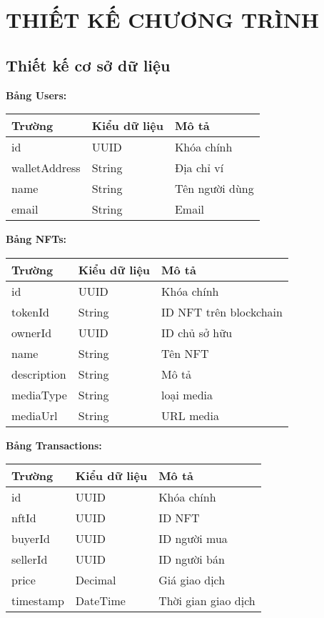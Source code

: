 \chapter{THIẾT KẾ CHƯƠNG TRÌNH}

\section{Thiết kế cơ sở dữ liệu}

\textbf{Bảng Users:}
\begin{center}
\begin{tabular}{|l|l|p{6cm}|}
    \hline
    \textbf{Trường} & \textbf{Kiểu dữ liệu} & \textbf{Mô tả} \\
    \hline
    id & UUID & Khóa chính \\
    \hline
    walletAddress & String & Địa chỉ ví \\
    \hline
    name & String & Tên người dùng \\
    \hline
    email & String & Email \\
    \hline
\end{tabular}
\end{center}

\textbf{Bảng NFTs:}
\begin{center}
\begin{tabular}{|l|l|p{6cm}|}
    \hline
    \textbf{Trường} & \textbf{Kiểu dữ liệu} & \textbf{Mô tả} \\
    \hline
    id & UUID & Khóa chính \\
    \hline
    tokenId & String & ID NFT trên blockchain \\
    \hline
    ownerId & UUID & ID chủ sở hữu \\
    \hline
    name & String & Tên NFT \\
    \hline
    description & String & Mô tả \\
    \hline
    mediaType & String & loại media\\
    \hline
    mediaUrl & String & URL media \\
    \hline
\end{tabular}
\end{center}

\textbf{Bảng Transactions:}
\begin{center}
\begin{tabular}{|l|l|p{6cm}|}
    \hline
    \textbf{Trường} & \textbf{Kiểu dữ liệu} & \textbf{Mô tả} \\
    \hline
    id & UUID & Khóa chính \\
    \hline
    nftId & UUID & ID NFT \\
    \hline
    buyerId & UUID & ID người mua \\
    \hline
    sellerId & UUID & ID người bán \\
    \hline
    price & Decimal & Giá giao dịch \\
    \hline
    timestamp & DateTime & Thời gian giao dịch \\
    \hline
\end{tabular}
\end{center}

